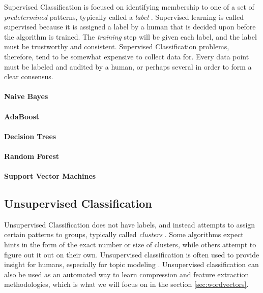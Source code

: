 Supervised Classification is focused on identifying membership to one of a set of \textit{predetermined} patterns, typically called a \textit{label} \cite{liu2007web}. Supervised learning is called supervised because it is assigned a label by a human that is decided upon before the algorithm is trained. The \textit{training} step will be given each label, and the label must be trustworthy and consistent. Supervised Classification problems, therefore, tend to be somewhat expensive to collect data for. Every data point must be labeled and audited by a human, or perhaps several in order to form a clear consensus.

\paragraph{Naive Bayes}

\paragraph{AdaBoost}

\paragraph{Decision Trees}

\paragraph{Random Forest}

\paragraph{Support Vector Machines}

\subsection{Unsupervised Classification}

Unsupervised Classification does not have labels, and instead attempts to assign certain patterns to groups, typically called \textit{clusters} \cite{celebi2015partitional}. Some algorithms expect hints in the form of the exact number or size of clusters, while others attempt to figure out it out on their own. Unsupervised classification is often used to provide insight for humans, especially for topic modeling \cite{celebi2015partitional}. Unsupervised classification can also be used as an automated way to learn compression and feature extraction methodologies, which is what we will focus on in the section \ref{sec:wordvectors}.  

